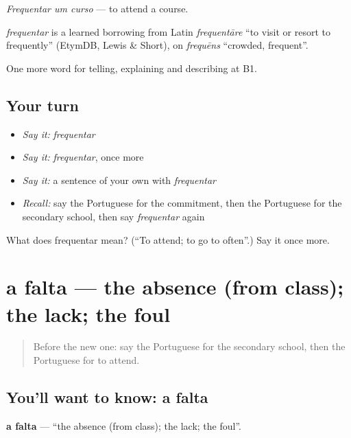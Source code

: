 \emph{Frequentar um curso} — to attend a course.

\begin{cousinweb}
\emph{frequentar} is a learned borrowing from Latin \emph{frequentāre} \textquotedblleft{}to visit or resort to frequently\textquotedblright{} (EtymDB, Lewis \& Short), on \emph{frequēns} \textquotedblleft{}crowded, frequent\textquotedblright{}.
\end{cousinweb}

\begin{grammarlens}[title={What you've built}]
One more word for telling, explaining and describing at B1.
\end{grammarlens}

\subsection*{Your turn}
\begin{itemize}
\raggedright
  \item \emph{Say it:} \emph{frequentar}
  \item \emph{Say it:} \emph{frequentar}, once more
  \item \emph{Say it:} a sentence of your own with \emph{frequentar}
  \item \emph{Recall:} say the Portuguese for the commitment, then the Portuguese for the secondary school, then say \emph{frequentar} again
\end{itemize}

\begin{tcolorbox}[breakable,colback=teal!4,colframe=teal!35!black,title={Before you move on}]
What does frequentar mean? (\textquotedblleft{}To attend; to go to often\textquotedblright{}.) Say it once more.
\end{tcolorbox}
\section[a falta]{a falta — the absence (from class); the lack; the foul}

\label{lesson:PT-C375-falta}



\begin{quote}
Before the new one: say the Portuguese for the secondary school, then the Portuguese for to attend.
\end{quote}

\subsection*{You'll want to know: a falta}
\textbf{a falta} — \textquotedblleft{}the absence (from class); the lack; the foul\textquotedblright{}.

